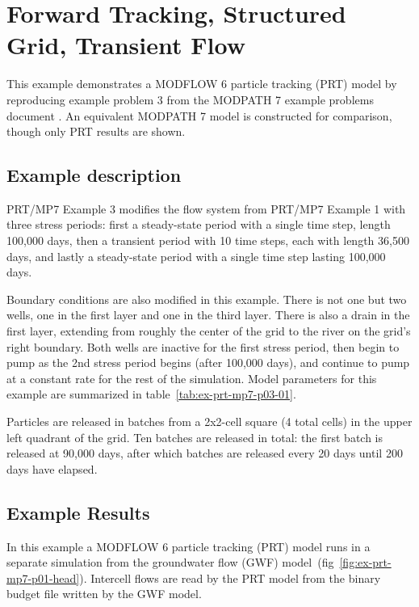 \section{Forward Tracking, Structured Grid, Transient Flow}

This example demonstrates a MODFLOW 6 particle tracking (PRT) model by reproducing example problem 3 from the MODPATH 7 \citep{pollock2016modpath7} example problems document \citep{modpath7examples}. An equivalent MODPATH 7 model is constructed for comparison, though only PRT results are shown.

\subsection{Example description}

PRT/MP7 Example 3 modifies the flow system from PRT/MP7 Example 1 with three stress periods: first a steady-state period with a single time step, length 100,000 days, then a transient period with 10 time steps, each with length 36,500 days, and lastly a steady-state period with a single time step lasting 100,000 days.

Boundary conditions are also modified in this example. There is not one but two wells, one in the first layer and one in the third layer. There is also a drain in the first layer, extending from roughly the center of the grid to the river on the grid's right boundary. Both wells are inactive for the first stress period, then begin to pump as the 2nd stress period begins (after 100,000 days), and continue to pump at a constant rate for the rest of the simulation. Model parameters for this example are summarized in table~\ref{tab:ex-prt-mp7-p03-01}.

Particles are released in batches from a 2x2-cell square (4 total cells) in the upper left quadrant of the grid. Ten batches are released in total: the first batch is released at 90,000 days, after which batches are released every 20 days until 200 days have elapsed.



\subsection{Example Results}

In this example a MODFLOW 6 particle tracking (PRT) model runs in a separate simulation from the groundwater flow (GWF) model~(fig~\ref{fig:ex-prt-mp7-p01-head}). Intercell flows are read by the PRT model from the binary budget file written by the GWF model.

